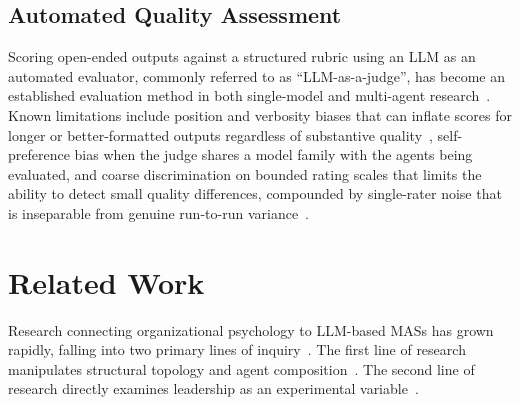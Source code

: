 \subsection{Automated Quality Assessment}
\label{subsec:automated-quality-assessment}

Scoring open-ended outputs against a structured rubric using an \ac{LLM} as an automated evaluator, commonly referred to as ``LLM-as-a-judge'', has become an established evaluation method in both single-model and multi-agent research~\cite{zheng2023judgingllmasajudgemtbenchchatbot, chen2025multiagentasjudgealigningllmagentbasedautomated}.
Known limitations include position and verbosity biases that can inflate scores for longer or better-formatted outputs regardless of substantive quality~\cite{zheng2023judgingllmasajudgemtbenchchatbot}, self-preference bias when the judge shares a model family with the agents being evaluated, and coarse discrimination on bounded rating scales that limits the ability to detect small quality differences, compounded by single-rater noise that is inseparable from genuine run-to-run variance~\cite{zheng2023judgingllmasajudgemtbenchchatbot, chen2025multiagentasjudgealigningllmagentbasedautomated, samuel2025personagymevaluatingpersonaagents}.

\section{Related Work}
\label{sec:related-work}

Research connecting organizational psychology to \ac{LLM}-based \acp{MAS} has grown rapidly, falling into two primary lines of inquiry~\cite{muralidharan2025lessonshumanteamsapplied, wang2026multiagentsystemsclassicalparadigms}.
The first line of research manipulates structural topology and agent composition~\cite{chen2023agentversefacilitatingmultiagentcollaboration, qian2024chatdevcommunicativeagentssoftware, duan2025powerpersonalityhumansimulation, zhang2024exploringcollaborationmechanismsllm}. 
The second line of research directly examines leadership as an experimental variable~\cite{kwak2026leadershipcoordinationcontrolbehavioral, faulkner2026evaluatingcooperationllmsocial, muralidharan2025lessonshumanteamsapplied}.

